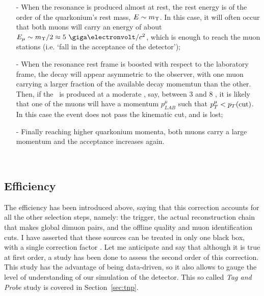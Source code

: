 \begin{itemize}
\item[-] When the resonance is produced almost at rest, the rest
  energy is of the order of the quarkonium's rest mass, $E \sim
  m_{\Upsilon}$. In this case, it will often occur that both muons will
  carry an energy of about
  $E_{\mu} \sim m_{\PgU}/2 \approx 5~\unitMass$, which is enough to
  reach the muon stations (i.e. `fall in the acceptance of the
  detector');
\item[-] When the resonance rest frame is boosted with respect to the
  laboratory frame, the decay will appear asymmetric to the observer, with one muon
  carrying a larger fraction of the available decay momemtun than the
  other. Then, if the \PgU\ is produced at a moderate \pt, say,
  between 3 and 8
  \GeVc, it is likely that one of the muons will have a momentum
  $p^{\mu}_{LAB}$ such that $p_{T}^{\mu} < p_{T}(\rm{cut})$. In this case
  the event does not pass the kinematic cut, and is lost;
\item[-] Finally reaching higher quarkonium momenta, both muons carry
  a large momentum and the acceptance increases again.
\end{itemize}


\vfill~\\

\subsection{Efficiency}
\label{sec:eff}
The efficiency has been introduced above, saying that this correction
accounts for all the other selection steps, namely: the trigger, the
actual reconstruction chain that makes global dimuon pairs, and the
offline quality and muon identification cuts. I have asserted that these sources can be treated in only one black box,
with a single correction factor \eff. Let me anticipate and say that
although it is true at first order, a study has been done to assess the
second order of this correction. This study has the advantage of being
data-driven, so it also allows to gauge the level of understanding of
our simulation of the detector. This so called \textit{Tag and Probe}
study is covered in Section~\ref{sec:tnp}.





